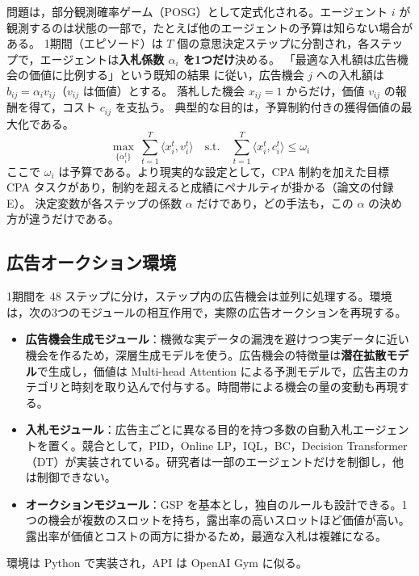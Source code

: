 \documentclass[twocolumn, a4paper, 10pt]{ujarticle}
\begin{document}
問題は，部分観測確率ゲーム（POSG）として定式化される。エージェント $i$ が観測するのは状態の一部で，たとえば他のエージェントの予算は知らない場合がある。
1期間（エピソード）は $T$ 個の意思決定ステップに分割され，各ステップで，エージェントは\textbf{入札係数 $\alpha_i$ を1つだけ}決める。
「最適な入札額は広告機会の価値に比例する」という既知の結果 \cite{balseiro2015} に従い，広告機会 $j$ への入札額は $b_{ij}=\alpha_i v_{ij}$（$v_{ij}$ は価値）とする。
落札した機会 $x_{ij}=1$ からだけ，価値 $v_{ij}$ の報酬を得て，コスト $c_{ij}$ を支払う。
典型的な目的は，予算制約付きの獲得価値の最大化である。
\begin{equation}
\max_{\{\alpha_i^t\}}\ \sum_{t=1}^{T}\langle x_i^t, v_i^t\rangle
\quad\text{s.t.}\quad \sum_{t=1}^{T}\langle x_i^t, c_i^t\rangle \le \omega_i
\tag{1}
\end{equation}
ここで $\omega_i$ は予算である。より現実的な設定として，CPA 制約を加えた目標 CPA タスクがあり，制約を超えると成績にペナルティが掛かる（論文の付録 E）。
決定変数が各ステップの係数 $\alpha$ だけであり，どの手法も，この $\alpha$ の決め方が違うだけである。

\subsection{広告オークション環境}

1期間を 48 ステップに分け，ステップ内の広告機会は並列に処理する。環境は，次の3つのモジュールの相互作用で，実際の広告オークションを再現する。
\begin{itemize}
\item \textbf{広告機会生成モジュール}：機微な実データの漏洩を避けつつ実データに近い機会を作るため，深層生成モデルを使う。広告機会の特徴量は\textbf{潜在拡散モデル}で生成し，価値は Multi-head Attention による予測モデルで，広告主のカテゴリと時刻を取り込んで付与する。時間帯による機会の量の変動も再現する。
\item \textbf{入札モジュール}：広告主ごとに異なる目的を持つ多数の自動入札エージェントを置く。競合として，PID，Online LP，IQL，BC，Decision Transformer（DT）が実装されている。研究者は一部のエージェントだけを制御し，他は制御できない。
\item \textbf{オークションモジュール}：GSP を基本とし，独自のルールも設計できる。1つの機会が複数のスロットを持ち，露出率の高いスロットほど価値が高い。露出率が価値とコストの両方に掛かるため，最適な入札は複雑になる。
\end{itemize}
環境は Python で実装され，API は OpenAI Gym に似る。
\end{document}
